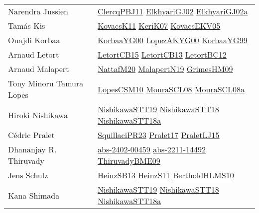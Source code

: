 {\begin{longtable}{p{4cm}p{20cm}}
Narendra Jussien & \href{papers/ClercqPBJ11.pdf}{ClercqPBJ11}\cite{ClercqPBJ11} \href{papers/ElkhyariGJ02.pdf}{ElkhyariGJ02}\cite{ElkhyariGJ02} \href{papers/ElkhyariGJ02a.pdf}{ElkhyariGJ02a}\cite{ElkhyariGJ02a} \\
Tam{\'{a}}s Kis & \href{articles/KovacsK11.pdf}{KovacsK11}\cite{KovacsK11} \href{papers/KeriK07.pdf}{KeriK07}\cite{KeriK07} \href{papers/KovacsEKV05.pdf}{KovacsEKV05}\cite{KovacsEKV05} \\
Ouajdi Korbaa & \href{articles/KorbaaYG00.pdf}{KorbaaYG00}\cite{KorbaaYG00} \href{articles/LopezAKYG00.pdf}{LopezAKYG00}\cite{LopezAKYG00} \href{papers/KorbaaYG99.pdf}{KorbaaYG99}\cite{KorbaaYG99} \\
Arnaud Letort & \href{articles/LetortCB15.pdf}{LetortCB15}\cite{LetortCB15} \href{papers/LetortCB13.pdf}{LetortCB13}\cite{LetortCB13} \href{papers/LetortBC12.pdf}{LetortBC12}\cite{LetortBC12} \\
Arnaud Malapert & \href{papers/NattafM20.pdf}{NattafM20}\cite{NattafM20} \href{papers/MalapertN19.pdf}{MalapertN19}\cite{MalapertN19} \href{papers/GrimesHM09.pdf}{GrimesHM09}\cite{GrimesHM09} \\
Tony Minoru Tamura Lopes & \href{articles/LopesCSM10.pdf}{LopesCSM10}\cite{LopesCSM10} \href{papers/MouraSCL08.pdf}{MouraSCL08}\cite{MouraSCL08} \href{papers/MouraSCL08a.pdf}{MouraSCL08a}\cite{MouraSCL08a} \\
Hiroki Nishikawa & \href{articles/NishikawaSTT19.pdf}{NishikawaSTT19}\cite{NishikawaSTT19} \href{papers/NishikawaSTT18.pdf}{NishikawaSTT18}\cite{NishikawaSTT18} \href{papers/NishikawaSTT18a.pdf}{NishikawaSTT18a}\cite{NishikawaSTT18a} \\
C{\'{e}}dric Pralet & \href{papers/SquillaciPR23.pdf}{SquillaciPR23}\cite{SquillaciPR23} \href{papers/Pralet17.pdf}{Pralet17}\cite{Pralet17} \href{papers/PraletLJ15.pdf}{PraletLJ15}\cite{PraletLJ15} \\
Dhananjay R. Thiruvady & \href{articles/abs-2402-00459.pdf}{abs-2402-00459}\cite{abs-2402-00459} \href{articles/abs-2211-14492.pdf}{abs-2211-14492}\cite{abs-2211-14492} \href{papers/ThiruvadyBME09.pdf}{ThiruvadyBME09}\cite{ThiruvadyBME09} \\
Jens Schulz & \href{articles/HeinzSB13.pdf}{HeinzSB13}\cite{HeinzSB13} \href{papers/HeinzS11.pdf}{HeinzS11}\cite{HeinzS11} \href{papers/BertholdHLMS10.pdf}{BertholdHLMS10}\cite{BertholdHLMS10} \\
Kana Shimada & \href{articles/NishikawaSTT19.pdf}{NishikawaSTT19}\cite{NishikawaSTT19} \href{papers/NishikawaSTT18.pdf}{NishikawaSTT18}\cite{NishikawaSTT18} \href{papers/NishikawaSTT18a.pdf}{NishikawaSTT18a}\cite{NishikawaSTT18a} \\

\end{longtable}}
